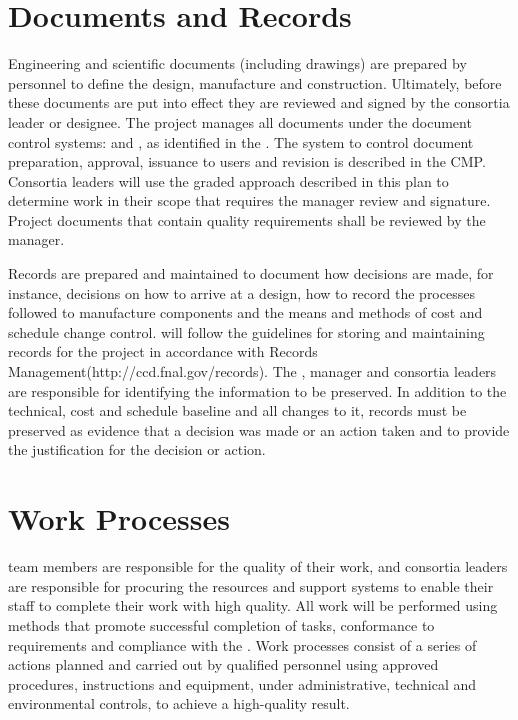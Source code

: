 \section{Documents and Records}

Engineering and scientific documents (including drawings) are prepared
by  personnel to define the design, manufacture and
construction. Ultimately, before these documents are put into effect
they are reviewed and signed by the  consortia leader or
designee.  The
 project manages all documents under the document control
systems:  and \docdb, as identified in the 
.  The system to control document preparation, approval,
issuance to users and revision is described in the CMP. Consortia
leaders will use the graded approach described in this plan to
determine work in their scope that requires the 
 manager review and signature. Project documents that
contain quality requirements shall be reviewed by the
  manager.

Records are prepared and maintained to document how decisions are
made, for instance, decisions on how to arrive at a design, how to
record the processes followed to manufacture components and the means
and methods of cost and schedule change
control.  will follow the guidelines for
storing and maintaining records for the project in accordance with
\fnal Records Management(http://ccd.fnal.gov/records). The
 ,  
manager and consortia leaders are responsible for identifying the
information to be preserved. In addition to the technical, cost and
schedule baseline and all changes to it, records must be preserved as
evidence that a decision was made or an action taken and to provide
the justification for the decision or action.

\section{Work Processes}

 team members are responsible for the quality of their
work, and consortia leaders are responsible for procuring the
resources and support systems to enable their staff to complete their
work with high quality. All  work will be performed using
methods that promote successful completion of tasks, conformance to
 requirements and compliance with the
 . Work processes consist of a
series of actions planned and carried out by qualified personnel using
approved procedures, instructions and equipment, under administrative,
technical and environmental controls, to achieve a high-quality
result.

